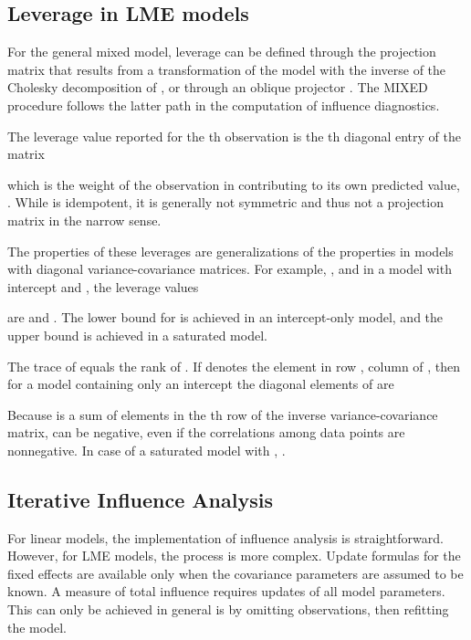 \documentclass[12pt, a4paper]{article}
\begin{document}
			
			
			

\subsection{Leverage in LME models}

For the general mixed model, leverage can be defined through the projection matrix that results from a transformation of the model with the inverse of the Cholesky decomposition of , or through an oblique projector \citep{schabenberger}. The MIXED procedure follows the latter path in the computation of influence diagnostics. 


The leverage value reported for the th observation is the th diagonal entry of the matrix

which is the weight of the observation in contributing to its own predicted value, .
While  is idempotent, it is generally not symmetric and thus not a projection matrix in the narrow sense.

The properties of these leverages are generalizations of the properties in models with diagonal variance-covariance matrices. For example, , and in a model with intercept and , the leverage values

are  and . The lower bound for  is achieved in an intercept-only model, and the upper bound is achieved in a saturated model. 

The trace of  equals the rank of .
If  denotes the element in row , column  of , then for a model containing only an intercept the diagonal elements of  are

Because  is a sum of elements in the th row of the inverse variance-covariance matrix,  can be negative, even if the correlations among data points are nonnegative. In case of a saturated model with , .			
			

	
\subsection{Iterative Influence Analysis}

For linear models, the implementation of influence analysis is straightforward.
However, for LME models, the process is more complex. Update formulas for the fixed effects are available only when the covariance parameters are assumed to be known. A measure of total influence requires updates of all model parameters.
This can only be achieved in general is by omitting observations, then refitting the model.
\end{document}
